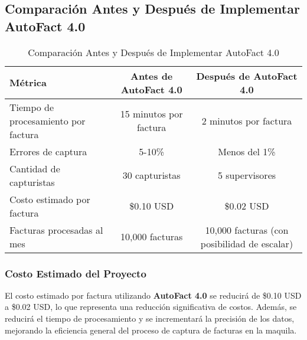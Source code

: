 \subsection{Comparación Antes y Después de Implementar AutoFact 4.0}

\begin{table}[H]
\centering
\caption{Comparación Antes y Después de Implementar AutoFact 4.0}
\begin{tabular}{|l|c|c|}
\hline
\textbf{Métrica} & \textbf{Antes de AutoFact 4.0} & \textbf{Después de AutoFact 4.0} \\ \hline
Tiempo de procesamiento por factura & 15 minutos por factura & 2 minutos por factura \\ \hline
Errores de captura & 5-10\% & Menos del 1\% \\ \hline
Cantidad de capturistas & 30 capturistas & 5 supervisores \\ \hline
Costo estimado por factura & \$0.10 USD & \$0.02 USD \\ \hline
Facturas procesadas al mes & 10,000 facturas & 10,000 facturas (con posibilidad de escalar) \\ \hline
\end{tabular}
\end{table}

\subsubsection{Costo Estimado del Proyecto}

El costo estimado por factura utilizando \textbf{AutoFact 4.0} se reducirá de \$0.10 USD a \$0.02 USD, lo que representa una reducción significativa de costos. Además, se reducirá el tiempo de procesamiento y se incrementará la precisión de los datos, mejorando la eficiencia general del proceso de captura de facturas en la maquila.

